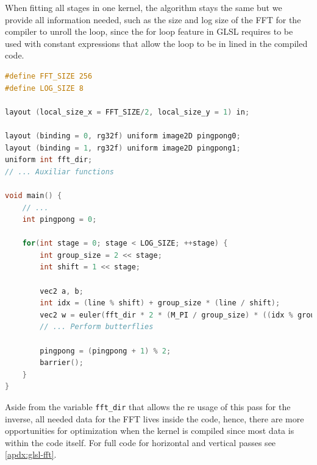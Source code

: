 \documentclass[
  oneside,
  11pt, a4paper,
  footinclude=true,
  headinclude=true,
  cleardoublepage=empty
]{scrbook}
\begin{document}
When fitting all stages in one kernel, the algorithm stays the same but we provide all information needed, such as the size and log size of the FFT for the compiler to unroll the loop, since the for loop feature in GLSL requires to be used with constant expressions that allow the loop to be in lined in the compiled code.
\newline 

\begin{lstlisting}[language=C,caption={Unique pass structure for Cooley-Tukey}]
#define FFT_SIZE 256
#define LOG_SIZE 8

layout (local_size_x = FFT_SIZE/2, local_size_y = 1) in;

layout (binding = 0, rg32f) uniform image2D pingpong0;
layout (binding = 1, rg32f) uniform image2D pingpong1;
uniform int fft_dir;
// ... Auxiliar functions

void main() {
    // ...
    int pingpong = 0;
    
    for(int stage = 0; stage < LOG_SIZE; ++stage) {
        int group_size = 2 << stage;
        int shift = 1 << stage;

        vec2 a, b;
        int idx = (line % shift) + group_size * (line / shift);
        vec2 w = euler(fft_dir * 2 * (M_PI / group_size) * ((idx % group_size) % shift));
        // ... Perform butterflies

        pingpong = (pingpong + 1) % 2;
        barrier();
    }
}
\end{lstlisting}

Aside from the variable \texttt{fft\_dir} that allows the re usage of this pass for the inverse, all needed data for the FFT lives inside the code, hence, there are more opportunities for optimization when the kernel is compiled since most data is within the code itself. For full code for horizontal and vertical passes see \autoref{apdx:glsl-fft}.

\end{document}
